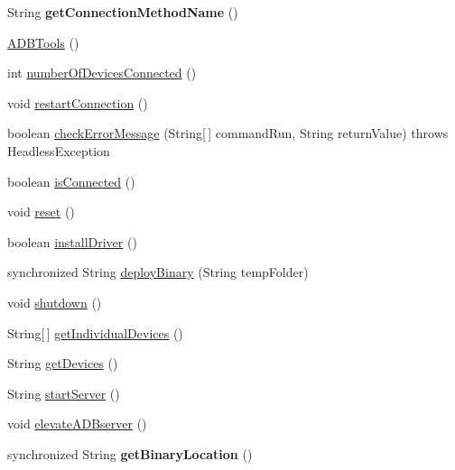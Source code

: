 \begin{DoxyCompactItemize}
\item 
\hypertarget{class_c_a_s_u_a_l_1_1communicationstools_1_1adb_1_1_a_d_b_tools_a2db7508e0a471d6dfb6f0379c840ca19}{String {\bfseries get\-Connection\-Method\-Name} ()}\label{class_c_a_s_u_a_l_1_1communicationstools_1_1adb_1_1_a_d_b_tools_a2db7508e0a471d6dfb6f0379c840ca19}

\item 
\hyperlink{class_c_a_s_u_a_l_1_1communicationstools_1_1adb_1_1_a_d_b_tools_aee532a6f0b295c9dc7f7eae458cc5a16}{A\-D\-B\-Tools} ()
\item 
int \hyperlink{class_c_a_s_u_a_l_1_1communicationstools_1_1adb_1_1_a_d_b_tools_a461c82203be61146b20039ecdf3a7ae7}{number\-Of\-Devices\-Connected} ()
\item 
void \hyperlink{class_c_a_s_u_a_l_1_1communicationstools_1_1adb_1_1_a_d_b_tools_ab15b541c5d89d360a9f46fb3f5d76315}{restart\-Connection} ()
\item 
boolean \hyperlink{class_c_a_s_u_a_l_1_1communicationstools_1_1adb_1_1_a_d_b_tools_a99c2fc63670a380b23c24753a036efec}{check\-Error\-Message} (String\mbox{[}$\,$\mbox{]} command\-Run, String return\-Value)  throws Headless\-Exception 
\item 
boolean \hyperlink{class_c_a_s_u_a_l_1_1communicationstools_1_1adb_1_1_a_d_b_tools_a4c683a1a71f68b1c50eadd438e7c3ed5}{is\-Connected} ()
\item 
void \hyperlink{class_c_a_s_u_a_l_1_1communicationstools_1_1adb_1_1_a_d_b_tools_aa91551344ddd6724490d06e7570b10d7}{reset} ()
\item 
boolean \hyperlink{class_c_a_s_u_a_l_1_1communicationstools_1_1adb_1_1_a_d_b_tools_ad02bc45e68c3b2102004309374a278e6}{install\-Driver} ()
\item 
synchronized String \hyperlink{class_c_a_s_u_a_l_1_1communicationstools_1_1adb_1_1_a_d_b_tools_a474cda9473f4e7d726fc0f780594a57d}{deploy\-Binary} (String temp\-Folder)
\item 
void \hyperlink{class_c_a_s_u_a_l_1_1communicationstools_1_1adb_1_1_a_d_b_tools_a9bdef58b74a1bfbe270ea5259ee0bd5e}{shutdown} ()
\item 
String\mbox{[}$\,$\mbox{]} \hyperlink{class_c_a_s_u_a_l_1_1communicationstools_1_1adb_1_1_a_d_b_tools_a3abf96e1e19c07136e4d9e0533023a71}{get\-Individual\-Devices} ()
\item 
String \hyperlink{class_c_a_s_u_a_l_1_1communicationstools_1_1adb_1_1_a_d_b_tools_a8d2da5fa61b82a00a60024675be69d0f}{get\-Devices} ()
\item 
String \hyperlink{class_c_a_s_u_a_l_1_1communicationstools_1_1adb_1_1_a_d_b_tools_a7b123fbc253f719b2f960f3d1481d9b8}{start\-Server} ()
\item 
void \hyperlink{class_c_a_s_u_a_l_1_1communicationstools_1_1adb_1_1_a_d_b_tools_a4a97cfb8be97201db41e6e35c5bce387}{elevate\-A\-D\-Bserver} ()
\item 
\hypertarget{class_c_a_s_u_a_l_1_1communicationstools_1_1adb_1_1_a_d_b_tools_a90f30d61fcab633f48db537aa917ca60}{synchronized String {\bfseries get\-Binary\-Location} ()}\label{class_c_a_s_u_a_l_1_1communicationstools_1_1adb_1_1_a_d_b_tools_a90f30d61fcab633f48db537aa917ca60}


\end{DoxyCompactItemize}
